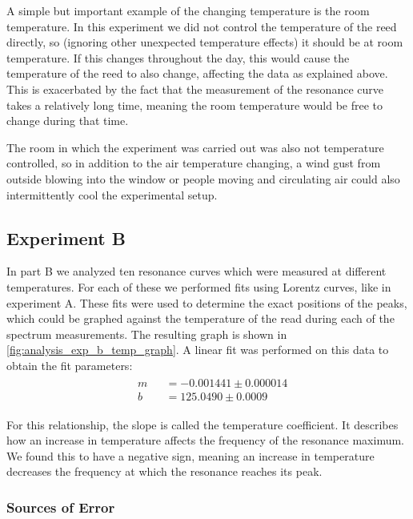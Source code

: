 A simple but important example of the changing temperature is the room temperature.
In this experiment we did not control the temperature of the reed directly, so (ignoring other unexpected temperature effects) it should be at room temperature.
If this changes throughout the day, this would cause the temperature of the reed to also change, affecting the data as explained above.
This is exacerbated by the fact that the measurement of the resonance curve takes a relatively long time, meaning the room temperature would be free to change during that time.

The room in which the experiment was carried out was also not temperature controlled, so in addition to the air temperature changing, a wind gust from outside blowing into the window or people moving and circulating air could also intermittently cool the experimental setup.


\subsection{Experiment B}

In part B we analyzed ten resonance curves which were measured at different temperatures. For each of these we performed fits using Lorentz curves, like in experiment A.
These fits were used to determine the exact positions of the peaks, which could be graphed against the temperature of the read during each of the spectrum measurements.
The resulting graph is shown in \autoref{fig:analysis_exp_b_temp_graph}.
A linear fit was performed on this data to obtain the fit parameters:
\begin{gather}
    \boxed{
        \begin{aligned}
             & m &  & = -0.001441 ± 0.000014 \\
             & b &  & = 125.0490 ± 0.0009
        \end{aligned}
    }
\end{gather}

For this relationship, the slope is called the temperature coefficient.
It describes how an increase in temperature affects the frequency of the resonance maximum.
We found this to have a negative sign, meaning an increase in temperature decreases the frequency at which the resonance reaches its peak.

\subsubsection{Sources of Error}

